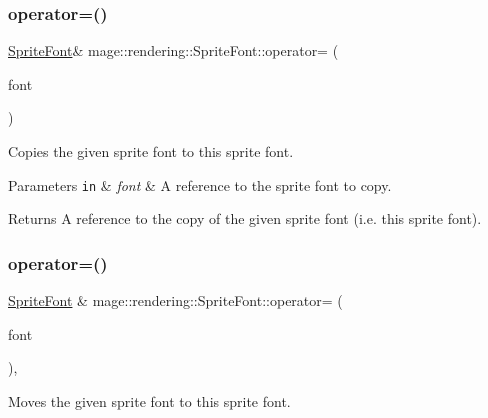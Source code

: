 \subsubsection{\texorpdfstring{operator=()}{operator=()}\hspace{0.1cm}{\footnotesize\ttfamily [1/2]}}
{\footnotesize\ttfamily \hyperlink{classmage_1_1rendering_1_1_sprite_font}{Sprite\+Font}\& mage\+::rendering\+::\+Sprite\+Font\+::operator= (\begin{DoxyParamCaption}\item[{const \hyperlink{classmage_1_1rendering_1_1_sprite_font}{Sprite\+Font} \&}]{font }\end{DoxyParamCaption})\hspace{0.3cm}{\ttfamily [delete]}}

Copies the given sprite font to this sprite font.


\begin{DoxyParams}[1]{Parameters}
\mbox{\tt in}  & {\em font} & A reference to the sprite font to copy. \\
\hline
\end{DoxyParams}
\begin{DoxyReturn}{Returns}
A reference to the copy of the given sprite font (i.\+e. this sprite font). 
\end{DoxyReturn}
\hypertarget{classmage_1_1rendering_1_1_sprite_font_a95317d173b64565c6cba865ca524fe2f}{}\label{classmage_1_1rendering_1_1_sprite_font_a95317d173b64565c6cba865ca524fe2f} 
\subsubsection{\texorpdfstring{operator=()}{operator=()}\hspace{0.1cm}{\footnotesize\ttfamily [2/2]}}
{\footnotesize\ttfamily \hyperlink{classmage_1_1rendering_1_1_sprite_font}{Sprite\+Font} \& mage\+::rendering\+::\+Sprite\+Font\+::operator= (\begin{DoxyParamCaption}\item[{\hyperlink{classmage_1_1rendering_1_1_sprite_font}{Sprite\+Font} \&\&}]{font }\end{DoxyParamCaption})\hspace{0.3cm}{\ttfamily [default]}, {\ttfamily [noexcept]}}

Moves the given sprite font to this sprite font.


